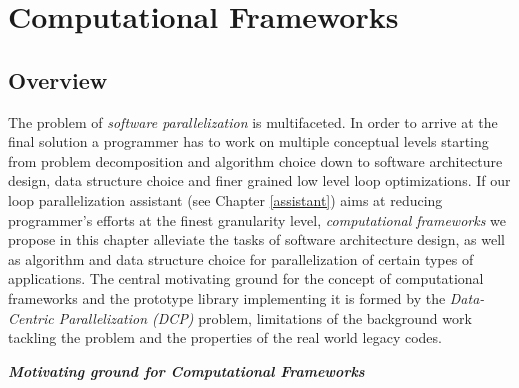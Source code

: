 \chapter{Computational Frameworks}
\label{frameworks}
\section{Overview}
\label{frameworks_overview}
\quad The problem of \textit{software parallelization} is multifaceted. In order to arrive at the final solution a programmer has to work on multiple conceptual levels starting from problem decomposition and algorithm choice down to software architecture design, data structure choice and finer grained low level loop optimizations. If our loop parallelization assistant (see Chapter \ref{assistant}) aims at reducing programmer's efforts at the finest granularity level, \textit{computational frameworks} we propose in this chapter alleviate the tasks of software architecture design, as well as algorithm and data structure choice for parallelization of certain types of applications. The central motivating ground for the concept of computational frameworks and the prototype library implementing it is formed by the \textit{Data-Centric Parallelization (DCP)} problem, limitations of the background work tackling the problem and the properties of the real world legacy codes.
\begin{center}
\textbf{\large \textit{Motivating ground for Computational Frameworks}}
\end{center}
